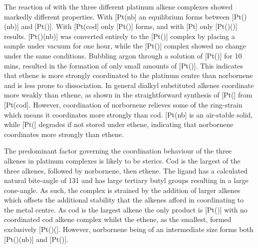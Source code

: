The reaction of \tButhixantphos{} with the three different platinum alkene complexes showed markedly different properties.  With [Pt(nb] an equilibrium forms between [Pt(\tButhixantphos)(nb)] and [Pt(\tButhixantphos)].  With [Pt(cod] only [Pt(\tButhixantphos)] forms, and with [Pt] only [Pt(\tButhixantphos)()] results. [Pt(\tButhixantphos)(nb)] was converted entirely to the [Pt(\tButhixantphos)] complex by placing a sample under vacuum for one hour, while the [Pt(\tButhixantphos)] complex showed no change under the same conditions.  Bubbling argon through a solution of [Pt(\tButhixantphos)] for 10 mins, resulted in the formation of only small amounts of [Pt(\tButhixantphos)].  This indicates that ethene is more strongly coordinated to the platinum centre than norbornene and is less prone to dissociation.  In general dialkyl substituted alkenes coordinate more weakly than ethene, as shown in the straightforward synthesis of [Pt(] from [Pt(cod].\cite{Green1975b, Tolman1974b}  However, coordination of norbornene relieves some of the ring-strain which means it coordinates more strongly than cod.  [Pt(nb] is an air-stable solid, while [Pt(] degrades if not stored under ethene, indicating that norbornene coordinates more strongly than ethene.


The predominant factor governing the coordination behaviour of the three alkenes in \tButhixantphos{} platinum complexes is likely to be sterics.  Cod is the largest of the three alkenes, followed by norbornene, then ethene.  The \tButhixantphos{} ligand has a calculated natural bite-angle of 131\degrees{} and has large tertiary butyl groups resulting in a large cone-angle.  As such, the complex is strained by the addition of larger alkenes which offsets the additional stability that the alkenes afford in coordinating to the metal centre.  As cod is the largest alkene the only product is [Pt(\tButhixantphos)] with no coordinated cod alkene complex whilst the ethene, as the smallest, formed exclusively [Pt(\tButhixantphos)(].  However, norbornene being of an intermediate size forms both [Pt(\tButhixantphos)(nb)] and [Pt(\tButhixantphos)].  

